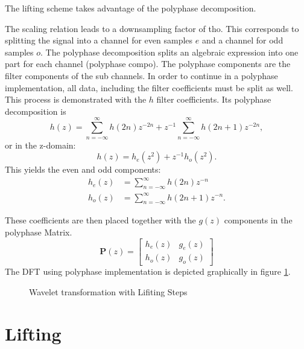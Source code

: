 \begin{refsection}
The lifting scheme takes advantage of the polyphase decomposition.

The scaling relation leads to a downsampling factor of tho.
This corresponds to splitting the signal into a channel for even samples $e$ and a channel for odd samples $o$.
The polyphase decomposition splits an algebraic expression into one part for each channel (polyphase compo).
The polyphase components are the filter components of the sub channels.
In order to continue in a polyphase implementation, all data, including the filter coefficients must be split as well.
This process is demonstrated with the $h$ filter coefficients.
Its polyphase decomposition is
\begin{equation}
	h(z) = \sum_{n=-\infty}^{\infty} h(2n)z^{-2n} + z^{-1} \sum_{n=-\infty}^{\infty} h(2n+1)z^{-2n},
\end{equation}
or in the z-domain:
\begin{equation}
	h(z)=h_{e}(z^2)+z^{-1} h_o(z^2).
\end{equation}
This yields the even and odd components:
\begin{align}
	h_e(z) &= \sum_{n=-\infty}^{\infty} h(2n)z^{-n}
	\\
	h_o(z) &= \sum_{n=-\infty}^{\infty} h(2n+1)z^{-n}.
\end{align}

These coefficients are then placed together with the $g(z)$ components in the polyphase Matrix.
\begin{equation}
	\bm P(z) = 
	\begin{bmatrix}
	h_e(z) & g_e(z) \\
	h_o(z) & g_o(z)
	\end{bmatrix}
\end{equation}
The DFT using polyphase implementation is depicted graphically in figure \ref{fpga:fig:liftingSteps}.
\begin{figure}
	\centering
	
	\caption{Wavelet transformation with Lifiting Steps}
	\label{fpga:fig:liftingSteps}
\end{figure}

\section{Lifting}


\end{refsection}
